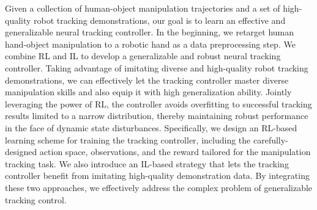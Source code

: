 Given a collection of human-object manipulation trajectories and a set of high-quality robot tracking demonstrations, our goal is to learn an effective and generalizable neural tracking controller. 
In the beginning, we retarget human hand-object manipulation to a robotic hand as a data preprocessing step. We combine RL and IL to develop a generalizable and robust neural tracking controller. 
Taking advantage of imitating diverse and high-quality robot tracking demonstrations, we can effectively let the tracking controller master diverse manipulation skills and also equip it with high generalization ability. 
Jointly leveraging the power of RL, the controller avoids overfitting to successful tracking results limited to a narrow distribution, thereby maintaining robust performance in the face of dynamic state disturbances.
Specifically, we design an RL-based learning scheme for training the tracking controller, including the carefully-designed action space, observations, and the reward tailored for the manipulation tracking task. We also introduce an IL-based strategy that lets the tracking controller benefit from imitating high-quality demonstration data. 
By integrating these two approaches, we effectively address the complex problem of generalizable tracking control.




